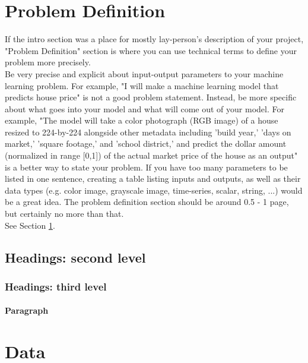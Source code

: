 \documentclass{article}
\begin{document}
\section{Problem Definition}
\label{sec:pb}
If the intro section was a place for mostly lay-person's description of your project, "Problem Definition" section is where you can use technical terms to define your problem more precisely.\\
Be very precise and explicit about input-output parameters to your machine learning problem. For example, "I will make a machine learning model that predicts house price"  is not a good problem statement. Instead, be more specific about what goes into your model and what will come out of your model. For example, "The model will take a color photograph (RGB image) of a house resized to 224-by-224 alongside other metadata including 'build year,' 'days on market,' 'square footage,' and 'school district,' and predict the dollar amount (normalized in range [0,1]) of the actual market price of the house as an output" is a better way to state your problem. If you have too many parameters to be listed in one sentence, creating a table listing inputs and outputs, as well as their data types (e.g. color image, grayscale image, time-series, scalar, string, ...) would be a great idea.
The problem definition section should be around 0.5 - 1 page, but certainly no more than that.\\

See Section \ref{sec:pb}.

\subsection{Headings: second level}


\subsubsection{Headings: third level}


\paragraph{Paragraph}


\section{Data}
\label{sec:Data}
\end{document}
